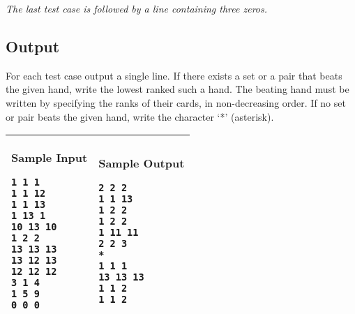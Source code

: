 \emph{The last test case is followed by a line containing three zeros.}

\subsection*{Output}
For each test case output a single line. If there exists a set or a pair
that beats the given hand, write the lowest ranked such a hand. The beating
hand must be written by specifying the ranks of their cards, in
non-decreasing order. If no set or pair beats the given hand, write the
character ‘*' (asterisk).

\newpage
\begin{table}[!ht]
\centering
\begin{tabular}{|l|l|}
\hline
\begin{minipage}[t]{3in}
\textbf{Sample Input}
\begin{verbatim}
1 1 1
1 1 12
1 1 13
1 13 1
10 13 10
1 2 2
13 13 13
13 12 13
12 12 12
3 1 4
1 5 9
0 0 0
\end{verbatim}
\vspace{1mm}
\end{minipage}
&

\begin{minipage}[t]{3in}
\textbf{Sample Output}
\begin{verbatim}
2 2 2
1 1 13
1 2 2
1 2 2
1 11 11
2 2 3
*
1 1 1
13 13 13
1 1 2
1 1 2
\end{verbatim}
\vspace{1mm}
\end{minipage} \\
\hline
\end{tabular}
\end{table}

\newpage
